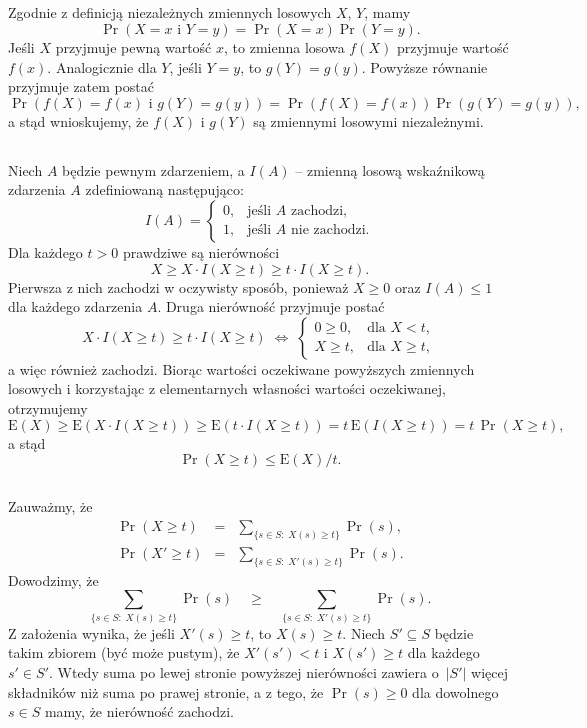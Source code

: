 \subsection{} %
Zgodnie z definicją niezależnych zmiennych losowych $X$, $Y$, mamy
\[
	\Pr(X=x\mbox{ i }Y=y) = \Pr(X=x)\Pr(Y=y).
\]
Jeśli $X$ przyjmuje pewną wartość $x$, to zmienna losowa $f(X)$ przyjmuje wartość $f(x)$. Analogicznie dla $Y$, jeśli $Y=y$, to $g(Y)=g(y)$. Powyższe równanie przyjmuje zatem postać
\[
	\Pr(f(X)=f(x)\mbox{ i }g(Y)=g(y)) = \Pr(f(X)=f(x))\Pr(g(Y)=g(y)),
\]
a stąd wnioskujemy, że $f(X)$ i $g(Y)$ są zmiennymi losowymi niezależnymi.

\subsection{} %
Niech $A$ będzie pewnym zdarzeniem, a $I(A)$ -- zmienną losową wskaźnikową zdarzenia $A$ zdefiniowaną następująco:
\[
	I(A) = \left\{\begin{array}{ll}
		0, & \mbox{jeśli }A\mbox{ zachodzi,} \\
		1, & \mbox{jeśli }A\mbox{ nie zachodzi.}
	\end{array}\right.
\]
Dla każdego $t>0$ prawdziwe są nierówności
\[
	X\ge X\cdot I(X\ge t)\ge t\cdot I(X\ge t).
\]
Pierwsza z nich zachodzi w oczywisty sposób, ponieważ $X\ge 0$ oraz $I(A)\le 1$ dla każdego zdarzenia $A$. Druga nierówność przyjmuje postać
\[
	X\cdot I(X\ge t)\ge t\cdot I(X\ge t)\;\Leftrightarrow\;\left\{\begin{array}{ll}
		0\ge 0, & \mbox{dla }X<t, \\
		X\ge t, & \mbox{dla }X\ge t,
	\end{array}\right.
\]
a więc również zachodzi. Biorąc wartości oczekiwane powyższych zmiennych losowych i korzystając z elementarnych własności wartości oczekiwanej, otrzymujemy
\[
	\mathrm{E}(X)\ge\mathrm{E}(X\cdot I(X\ge t))\ge\mathrm{E}(t\cdot I(X\ge t)) = t\,\mathrm{E}(I(X\ge t)) = t\,\Pr(X\ge t),
\]
a stąd
\[
	\Pr(X\ge t)\le\mathrm{E}(X)/t.
\]

\subsection{} %
Zauważmy, że
\begin{eqnarray*}
	\Pr(X\ge t) &=& \sum_{\{ s\in S:\;X(s)\ge t\}}\Pr(s), \\
	\Pr(X'\ge t) &=& \sum_{\{ s\in S:\;X'(s)\ge t\}}\Pr(s).
\end{eqnarray*}
Dowodzimy, że
\[
	\sum_{\{ s\in S:\;X(s)\ge t\}}\Pr(s)\quad\ge\quad\sum_{\{ s\in S:\;X'(s)\ge t\}}\Pr(s).
\]
Z założenia wynika, że jeśli $X'(s)\ge t$, to $X(s)\ge t$. Niech $S'\subseteq S$ będzie takim zbiorem (być może pustym), że $X'(s')<t$ i $X(s')\ge t$ dla każdego $s'\in S'$. Wtedy suma po lewej stronie powyższej nierówności zawiera o~$|S'|$ więcej składników niż suma po prawej stronie, a z tego, że $\Pr(s)\ge 0$ dla dowolnego $s\in S$ mamy, że nierówność zachodzi.

